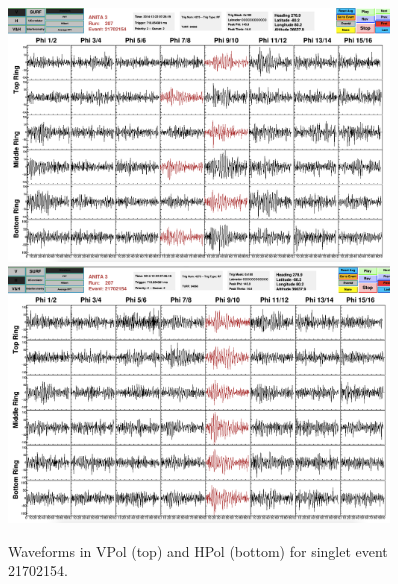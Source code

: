 \begin{figure}
\centering
\includegraphics[width=0.9\textwidth]{figures/21702154V.png}
\includegraphics[width=0.9\textwidth]{figures/21702154H.png}
\caption{Waveforms in VPol (top) and HPol (bottom) for singlet event 21702154.}
\label{21702154_wave}
\end{figure}



